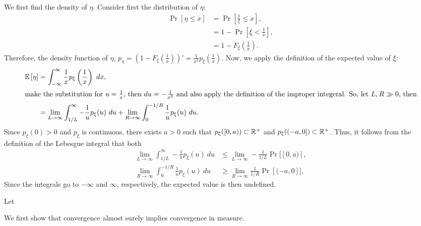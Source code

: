 \begin{problem}{6}
\end{problem}
\begin{solution}
    We first find the density of $\eta$. Consider first the distribution of $\eta$:
    \begin{align*}
        \Pr[\eta \leq x] &= \Pr\left[\frac{1}{\xi} \leq x\right], \\
        &= 1 - \Pr\left[\xi < \frac{1}{x}\right], \\
        &= 1 - F_\xi\left(\frac{1}{x}\right).
    \end{align*}
    Therefore, the density function of $\eta$, $p_\eta = \left(1-F_\xi\left(\frac{1}{x}\right)\right)' = \frac{1}{x^2}p_\xi\left(\frac{1}{x}\right)$. Now, we apply the definition of the expected value of $\xi$:
    \begin{align*}
        \mathbb{E}\left[\eta\right] &= \int_{-\infty}^\infty \frac{1}{x}p_\xi\left(\frac{1}{x}\right)~dx, \\
        \intertext{make the substitution for $u = \frac{1}{x}$, then $du=-\frac{1}{x^2}$ and also apply the definition of the improper integeral. So, let $L,R \gg 0$, then}
        &= \lim_{L\to\infty} \int_{1/L}^\infty -\frac{1}{u}p_\xi(u)~du + \lim_{R\to\infty}\int_0^{-1/R} \frac{1}{u}p_\xi(u)~du. 
    \end{align*}
    Since $p_\xi(0) > 0$ and $p_\xi$ is continuous, there exists $a > 0$ such that $p_\xi([0,a)) \subset \mathbb{R}^+$ and $p_\xi((-a,0]) \subset \mathbb{R}^+$. Thus, it follows from the definition of the Lebesgue integral that both 
    \begin{align*}
        \lim_{L\to\infty} \int_{1/L}^\infty -\frac{1}{u}p_\xi(u)~du &\leq \lim_{L\to\infty} -\frac{1}{1/L} \Pr[[0,a)], \\
        \lim_{R \to\infty} \int_0^{-1/R} \frac{1}{u} p_\xi(u)~du &\geq \lim_{R\to\infty} \frac{1}{1/R} \Pr[(-a,0]],  
    \end{align*}
    Since the integrals go to $-\infty$ and $\infty$, respectively, the expected value is then undefined. 
\end{solution}

\begin{problem}{7}
\end{problem}
\begin{solution}
    Let 
\end{solution}

\begin{problem}{8}
\end{problem}
\begin{solution}
    We first show that convergence almost surely implies convergence in measure. 
\end{solution}

